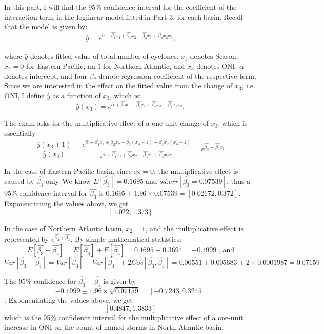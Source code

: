 \documentclass[12pt,a4paper]{article}
\begin{document}
In this part, I will find the 95\% confidence interval for the coefficient of the interaction term in the loglinear model fitted in Part 3, for each basin. Recall that the model is given by:\\ $$\hat{y}=e^{\hat{\alpha}+\hat{\beta_1}x_{1} + \hat{\beta_2}x_{2}+\hat{\beta_3}x_{3}+\hat{\beta_4}x_{2}x_{3}}, $$\\
where $\hat{y}$ denotes fitted value of total number of cyclones, $x_{1}$ denotes Season, $x_{2}=0$ for Eastern Pacific, an $1$ for Northern Atlantic, and $x_{3}$ denotes ONI. $\alpha$ denotes intercept, and four $\beta$s denote regression coefficient of the respective term. 
Since we are interested in the effect on the fitted value from the change of $x_3$, i.e. ONI, I define $\hat{y}$ as a function of $x_3$, which is: \\ $$\hat{y}(x_3)=e^{\hat{\alpha}+\hat{\beta_1}x_{1} + \hat{\beta_2}x_{2}+\hat{\beta_3}x_{3}+\hat{\beta_4}x_{2}x_{3}}, $$

The exam asks for the multiplicative effect of a one-unit change of $x_3$, which is essentially
$$\frac{\hat{y}(x_3+1)}{\hat{y}(x_3)}= \frac{e^{\hat{\alpha}+\hat{\beta_1}x_{1} + \hat{\beta_2}x_{2}+\hat{\beta_3}(x_{3}+1)+\hat{\beta_4}x_{2}(x_{3}+1)}}{e^{\hat{\alpha}+\hat{\beta_1}x_{1} + \hat{\beta_2}x_{2}+\hat{\beta_3}x_{3}+\hat{\beta_4}x_{2}x_{3}}}=e^{\hat{\beta_3}+\hat{\beta_4}x_2}$$


In the case of Eastern Pacific basin, since $x_2=0$, the multiplicative effect is caused by $\hat{\beta_3}$ only. We know $E[\hat{\beta_3}]=0.1695$ and $sd.err[\hat{\beta_3}=0.07539]$, thus a 95\% confidence interval for $\hat{\beta_3}$ is $0.1695\pm1.96\times0.07539=[0.02172, 0.372]$. Exponentiating the values above, we get $$[1.022, 1.373]$$

In the case of Northern Atlantic basin, $x_2=1$, and the multiplicative effect is represented by $e^{\hat{\beta_3}+\hat{\beta_4}}$. By simple mathematical statistics:
$$E[\hat{\beta_3}+\hat{\beta_4}] = E[\hat{\beta_3}]+E[\hat{\beta_4}] = 0.1695-0.3694=-0.1999 \text{ , and}$$ 
$$Var[\hat{\beta_3}+\hat{\beta_4}] = Var[\hat{\beta_3}]+Var[\hat{\beta_4}] + 2Cov[\hat{\beta_3},\hat{\beta_4}] = 0.06551+0.005683+2\times0.0001987= 0.07159$$

The 95\% confidence for $\hat{\beta_3}+\hat{\beta_4}$ is given by 
$$-0.1999\pm 1.96 \times \sqrt{0.07159} = [-0.7243, 0.3245]$$.
Exponentiating the values above, we get $$[0.4847, 1.3833]$$
which is the 95\% confidence interval for the multiplicative effect of a one-unit increase in ONI on the count of named storms in North Atlantic basin.
\end{document}
